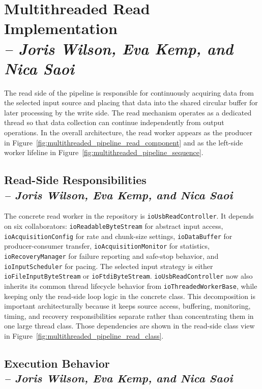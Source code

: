 \section{Multithreaded Read Implementation \\
\small{\textit{-- Joris Wilson, Eva Kemp, and Nica Saoi}}}
\label{Section::Multithreaded Read Implementation}

The read side of the pipeline is responsible for continuously acquiring data from the selected input source and placing that data into the shared circular buffer for later processing by the write side. The read mechanism operates as a dedicated thread so that data collection can continue independently from output operations. In the overall architecture, the read worker appears as the producer in Figure~\ref{fig:multithreaded_pipeline_read_component} and as the left-side worker lifeline in Figure~\ref{fig:multithreaded_pipeline_sequence}.

\subsection{Read-Side Responsibilities \\
\small{\textit{-- Joris Wilson, Eva Kemp, and Nica Saoi}}}
\label{Section::Read-Side Responsibilities}

The concrete read worker in the repository is \texttt{ioUsbReadController}. It depends on six collaborators: \texttt{ioReadableByteStream} for abstract input access, \texttt{ioAcquisitionConfig} for rate and chunk-size settings, \texttt{ioDataBuffer} for producer-consumer transfer, \texttt{ioAcquisitionMonitor} for statistics, \texttt{ioRecoveryManager} for failure reporting and safe-stop behavior, and \texttt{ioInputScheduler} for pacing. The selected input strategy is either \texttt{ioFileInputByteStream} or \texttt{ioFtdiByteStream}. \texttt{ioUsbReadController} now also inherits its common thread lifecycle behavior from \texttt{ioThreadedWorkerBase}, while keeping only the read-side loop logic in the concrete class. This decomposition is important architecturally because it keeps source access, buffering, monitoring, timing, and recovery responsibilities separate rather than concentrating them in one large thread class. Those dependencies are shown in the read-side class view in Figure~\ref{fig:multithreaded_pipeline_read_class}.

\subsection{Execution Behavior \\
\small{\textit{-- Joris Wilson, Eva Kemp, and Nica Saoi}}}
\label{Section::Execution Behavior}


